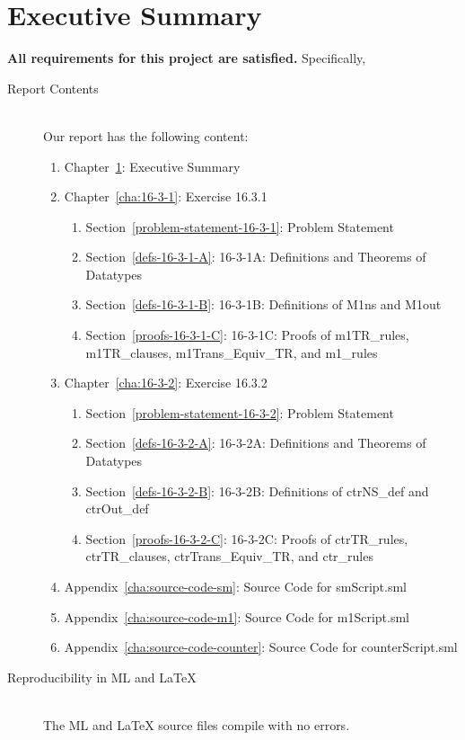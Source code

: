 \documentclass{report}
\begin{document}
\chapter{Executive Summary}
\label{cha:executive-summary}
\textbf{All requirements for this project are satisfied.}
Specifically,
\begin{description}
\item[Report Contents] \ \\
  Our report has the following content:
  \begin{enumerate}[{}]
  \item Chapter~\ref{cha:executive-summary}: Executive Summary
  \item Chapter~\ref{cha:16-3-1}: Exercise 16.3.1
    \begin{enumerate}[{}]
    \item Section~\ref{problem-statement-16-3-1}: Problem Statement
    \item Section~\ref{defs-16-3-1-A}: 16-3-1A: Definitions and Theorems of Datatypes
    \item Section~\ref{defs-16-3-1-B}: 16-3-1B: Definitions of M1ns and M1out
    \item Section~\ref{proofs-16-3-1-C}: 16-3-1C: Proofs of m1TR_rules, m1TR_clauses, m1Trans_Equiv_TR, and m1_rules
    \end{enumerate}
  \item Chapter~\ref{cha:16-3-2}: Exercise 16.3.2
    \begin{enumerate}[{}]
    \item Section~\ref{problem-statement-16-3-2}: Problem Statement
    \item Section~\ref{defs-16-3-2-A}: 16-3-2A: Definitions and Theorems of Datatypes 
    \item Section~\ref{defs-16-3-2-B}: 16-3-2B: Definitions of ctrNS_def and ctrOut_def
    \item Section~\ref{proofs-16-3-2-C}: 16-3-2C: Proofs of ctrTR_rules, ctrTR_clauses, ctrTrans_Equiv_TR, and ctr_rules
    \end{enumerate}
 \item Appendix~\ref{cha:source-code-sm}: Source Code for smScript.sml
 \item Appendix~\ref{cha:source-code-m1}: Source Code for m1Script.sml
 \item Appendix~\ref{cha:source-code-counter}: Source Code for counterScript.sml
  \end{enumerate}
\item[Reproducibility in ML and \LaTeX{}] \ \\
  The ML and \LaTeX{} source files compile with no errors.
\end{description}
\end{document}
